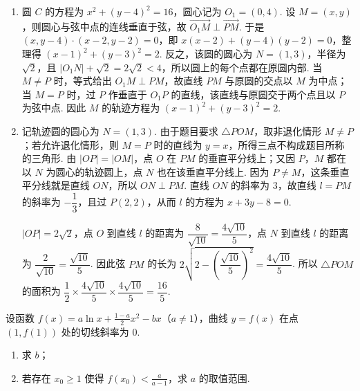 \begin{solution}
\begin{enumerate}
\item 圆 \(C\) 的方程为 \(x^2+(y-4)^2=16\)，圆心记为 \(O_1=(0,4)\). 设 \(M=(x,y)\)，则圆心与弦中点的连线垂直于弦，故 \(\overrightarrow{O_1M}\perp\overrightarrow{PM}\). 于是 \((x,y-4)\cdot(x-2,y-2)=0\)，即 \(x(x-2)+(y-4)(y-2)=0\)，整理得 \((x-1)^2+(y-3)^2=2\). 反之，该圆的圆心为 \(N=(1,3)\)，半径为 \(\sqrt{2}\)，且 \(\lvert O_1N\rvert+\sqrt{2}=2\sqrt{2}<4\)，所以圆上的每个点都在原圆内部. 当 \(M\ne P\) 时，等式给出 \(O_1M\perp PM\)，故直线 \(PM\) 与原圆的交点以 \(M\) 为中点；当 \(M=P\) 时，过 \(P\) 作垂直于 \(O_1P\) 的直线，该直线与原圆交于两个点且以 \(P\) 为弦中点. 因此 \(M\) 的轨迹方程为 \((x-1)^2+(y-3)^2=2\).
\item 记轨迹圆的圆心为 \(N=(1,3)\). 由于题目要求 \(\triangle POM\)，取非退化情形 \(M\ne P\)；若允许退化情形，则 \(M=P\) 时的直线为 \(y=x\)，所得三点不构成题目所称的三角形. 由 \(|OP|=|OM|\)，点 \(O\) 在 \(PM\) 的垂直平分线上；又因 \(P\)，\(M\) 都在以 \(N\) 为圆心的轨迹圆上，点 \(N\) 也在该垂直平分线上. 因为 \(P\ne M\)，这条垂直平分线就是直线 \(ON\)，所以 \(ON\perp PM\). 直线 \(ON\) 的斜率为 \(3\)，故直线 \(l=PM\) 的斜率为 \(-\dfrac13\)，且过 \(P(2,2)\)，从而 \(l\) 的方程为 \(x+3y-8=0\).

\(|OP|=2\sqrt2\)，点 \(O\) 到直线 \(l\) 的距离为 \(\dfrac8{\sqrt{10}}=\dfrac{4\sqrt{10}}5\)，点 \(N\) 到直线 \(l\) 的距离为 \(\dfrac2{\sqrt{10}}=\dfrac{\sqrt{10}}5\). 因此弦 \(PM\) 的长为 \(2\sqrt{2-\left(\dfrac{\sqrt{10}}5\right)^2}=\dfrac{4\sqrt{10}}5\). 所以 \(\triangle POM\) 的面积为 \(\dfrac12\times\dfrac{4\sqrt{10}}5\times\dfrac{4\sqrt{10}}5=\dfrac{16}{5}\).
\end{enumerate}
\end{solution}

\begin{problem}
设函数 \( f(x) = a \ln x + \frac{1 - a}{2} x^2 - bx\)（\(a \neq 1\)），曲线 \( y = f(x) \) 在点 \((1,f(1))\) 处的切线斜率为 \(0\).

\begin{enumerate}
\item 求 \(b\)；
\item 若存在 \(x_0 \geqslant 1\) 使得 \(f(x_0) < \frac{a}{a - 1}\)，求 \(a\) 的取值范围.
\end{enumerate}
\end{problem}

